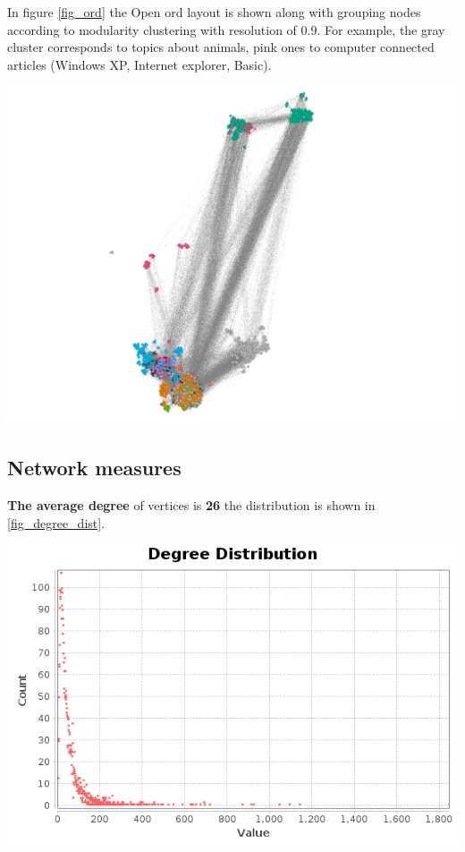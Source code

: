 In figure \ref{fig_ord} the Open ord layout is shown along with grouping nodes according to modularity clustering with resolution of $0.9$. For example, the gray cluster corresponds to topics about animals, pink ones to computer connected articles (Windows XP, Internet explorer, Basic).

\begin{center}
    \includegraphics[width=0.75\linewidth]{../results/layout_2.png}
    \label{fig_ord}
\end{center}

\subsection*{Network measures}

\textbf{The average degree} of vertices is \textbf{26} the distribution is shown in \ref{fig_degree_dist}.

\begin{center}
    \includegraphics[width=0.75\linewidth]{../results/degree/degree-distribution.png}
    \label{fig_degree_dist}
\end{center}

